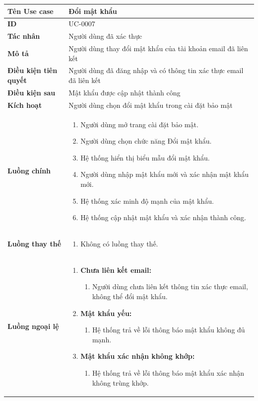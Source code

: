 {
\renewcommand{\arraystretch}{1.5}

\begin{tabularx}{\textwidth}{|>{\raggedright\arraybackslash}X|>{\raggedright\arraybackslash}X|}
\hline
\textbf{Tên Use case} & Đổi mật khẩu \\
\hline
\textbf{ID} & UC-0007 \\
\hline
\textbf{Tác nhân} & Người dùng đã xác thực \\
\hline
\textbf{Mô tả} & Người dùng thay đổi mật khẩu của tài khoản email đã liên kết \\
\hline
\textbf{Điều kiện tiên quyết} & Người dùng đã đăng nhập và có thông tin xác thực email đã liên kết \\
\hline
\textbf{Điều kiện sau} & Mật khẩu được cập nhật thành công \\
\hline
\textbf{Kích hoạt} & Người dùng chọn đổi mật khẩu trong cài đặt bảo mật \\
\hline
\textbf{Luồng chính} &
\begin{enumerate}
    \item Người dùng mở trang cài đặt bảo mật.
    \item Người dùng chọn chức năng Đổi mật khẩu.
    \item Hệ thống hiển thị biểu mẫu đổi mật khẩu.
    \item Người dùng nhập mật khẩu mới và xác nhận mật khẩu mới.
    \item Hệ thống xác minh độ mạnh của mật khẩu.
    \item Hệ thống cập nhật mật khẩu và xác nhận thành công.
\end{enumerate} \\
\hline
\textbf{Luồng thay thế} &
\begin{enumerate}
    \item Không có luồng thay thế.
\end{enumerate} \\
\hline
\textbf{Luồng ngoại lệ} &
\begin{enumerate}
    \item \textbf{Chưa liên kết email:}
    \begin{enumerate}
        \item[2Err.] Người dùng chưa liên kết thông tin xác thực email, không thể đổi mật khẩu.
    \end{enumerate}
    \item \textbf{Mật khẩu yếu:}
    \begin{enumerate}
        \item[5Err.] Hệ thống trả về lỗi thông báo mật khẩu không đủ mạnh.
    \end{enumerate}
    \item \textbf{Mật khẩu xác nhận không khớp:}
    \begin{enumerate}
        \item[5Err2.] Hệ thống trả về lỗi thông báo mật khẩu xác nhận không trùng khớp.
    \end{enumerate}
\end{enumerate} \\
\hline
\end{tabularx}
}
